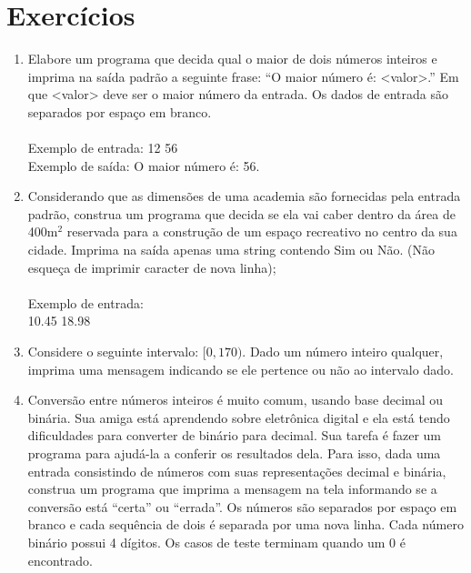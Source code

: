 \newpage
\section{Exercícios}

\begin{enumerate}
  \item Elabore um programa que decida qual o maior de dois números inteiros e imprima na saída padrão a seguinte     
  frase: ``O maior número é: <valor>.'' Em que <valor> deve ser o maior número da entrada. Os dados de entrada são separados por espaço em branco.\\
  \\Exemplo de entrada: 12 56
  \\Exemplo de saída: O maior número é: 56.
  
  
  \item Considerando que as dimensões de uma academia são fornecidas pela entrada padrão, construa um programa que        
  decida se ela vai caber dentro da área de 400m$^{2}$ reservada para a construção de um espaço recreativo no       
  centro da sua cidade. Imprima na saída apenas uma string contendo Sim ou Não. (Não esqueça de imprimir caracter de nova linha);\\
  \\ Exemplo de entrada: \\10.45 18.98
  
  \item Considere o seguinte intervalo: $[0, 170)$. Dado um número inteiro qualquer, imprima uma mensagem 
  indicando se ele pertence ou não ao intervalo dado.
  
  \item Conversão entre números inteiros é muito comum, usando base decimal ou binária. Sua amiga está aprendendo sobre eletrônica digital e ela está tendo dificuldades para converter de binário para decimal. Sua tarefa é fazer um programa para ajudá-la a conferir os resultados dela. Para isso, dada uma entrada consistindo de números com suas representações decimal e binária, construa um programa que imprima a mensagem na tela informando se a conversão está ``certa'' ou ``errada''. Os números são separados por espaço em branco e cada sequência de dois é separada por uma nova linha. Cada número binário possui 4 dígitos. Os casos de teste terminam quando um 0 é encontrado.\\
  
  
    \begin{minipage}{.45\textwidth}
      \centering


\end{minipage}
\end{enumerate}
